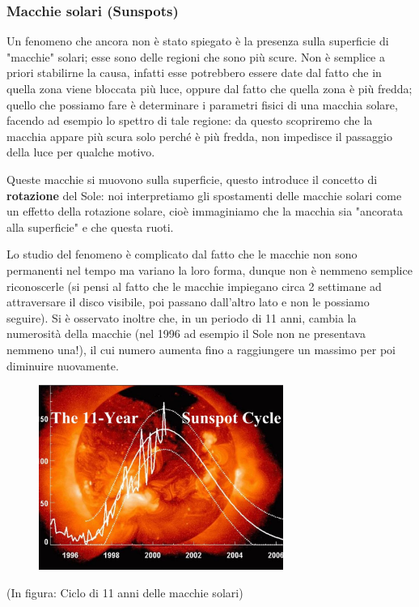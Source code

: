 \subsubsection{Macchie solari (Sunspots)}
Un fenomeno che ancora non è stato spiegato è la presenza sulla superficie di "macchie" solari; esse sono delle regioni che sono più scure. Non è semplice a priori stabilirne la causa, infatti esse potrebbero essere date dal fatto che in quella zona viene bloccata più luce, oppure dal fatto che quella zona è più fredda; quello che possiamo fare è determinare i parametri fisici di una macchia solare, facendo ad esempio lo spettro di tale regione: da questo scopriremo che la macchia appare più scura solo perché è più fredda, non impedisce il passaggio della luce per qualche motivo.

Queste macchie si muovono sulla superficie, questo introduce il concetto di \textbf{rotazione} del Sole: noi interpretiamo gli spostamenti delle macchie solari come un effetto della rotazione solare, cioè immaginiamo che la macchia sia "ancorata alla superficie" e che questa ruoti.

Lo studio del fenomeno è complicato dal fatto che le macchie non sono permanenti nel tempo ma variano la loro forma, dunque non è nemmeno semplice riconoscerle (si pensi al fatto che le macchie impiegano circa 2 settimane ad attraversare il disco visibile, poi passano dall'altro lato e non le possiamo seguire). Si è osservato inoltre che, in un periodo di 11 anni, cambia la numerosità della macchie (nel 1996 ad esempio il Sole non ne presentava nemmeno una!), il cui numero aumenta fino a raggiungere un massimo per poi diminuire nuovamente.

\begin{figure}[H]
    \centering
    \includegraphics[width=8cm]{2dic/Ciclo11Anni.jpg}
    \label{fig:Ciclo11}
\end{figure}

(In figura: Ciclo di 11 anni delle macchie solari)

